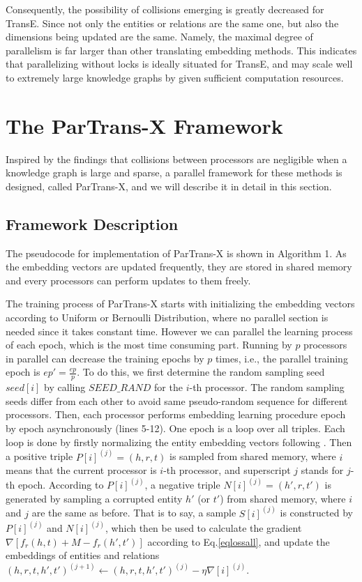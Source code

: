 \documentclass[sigconf]{acmart}
\begin{document}
Consequently, the possibility of collisions emerging is greatly decreased for TransE. Since not only the entities or relations are the same one, but also the dimensions being updated are the same. Namely, the maximal degree of parallelism is far larger than other translating embedding methods.
This indicates that parallelizing without locks is ideally situated for TransE, and may scale well to extremely large knowledge graphs by given sufficient computation resources.

\section{The ParTrans-X Framework}

Inspired by the findings that collisions between processors are negligible when a knowledge graph is large and sparse, a parallel framework for these methods is designed, called ParTrans-X, and we will describe it in detail in this section. 

\subsection{Framework Description}

The pseudocode for implementation of ParTrans-X is shown in Algorithm 1.
As the embedding vectors are updated frequently, they are stored in shared memory and every processors can perform updates to them freely. 

The training process of ParTrans-X starts with initializing the embedding vectors according to Uniform or Bernoulli Distribution, where no parallel section is needed since it takes constant time.  
However we can parallel the learning process of each epoch, which is the most time consuming part. Running by $p$ processors in parallel can decrease the training epochs by $p$ times, i.e., the parallel training epoch is $ep' = \frac{ep}{p}$. To do this, we first determine the random sampling seed $seed[i]$ by calling $SEED\_RAND$ for the $i$-th processor. The random sampling seeds differ from each other 
to avoid same pseudo-random sequence for different processors.
Then, each processor performs embedding learning procedure epoch by epoch asynchronously (lines 5-12). One epoch is a loop over all triples. Each loop is done by firstly normalizing the entity embedding vectors following \cite{bordes2013translating}. Then a positive triple $P[i]^{(j)}=(h,r,t)$ is sampled from shared memory, where $i$ means that the current processor is $i$-th processor, and superscript $j$ stands for $j$-th epoch. According to $P[i]^{(j)}$, a negative triple $N[i]^{(j)}=(h',r,t')$ is generated by sampling a corrupted entity $h'$ (or $t'$) from shared memory, where $i$ and $j$ are the same as before. That is to say, a sample $S[i]^{(j)}$ is constructed by $P[i]^{(j)}$ and $N[i]^{(j)}$, which then be used to calculate the gradient $ \nabla[f_r(h,t)+M-f_r(h',t')]$ according to Eq.\eqref{eqlossall}, and update the embeddings of entities and relations $(h,r,t,h',t')^{(j+1)} \gets (h,r,t,h',t')^{(j)} -\eta\nabla[i]^{(j)}$.
\end{document}
